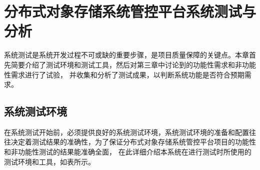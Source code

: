 \renewcommand{\arraystretch}{1.5}
\chapter{分布式对象存储系统管控平台系统测试与分析}

系统测试是系统开发过程不可或缺的重要步骤，是项目质量保障的关键点。本章首先简要介绍了测试环境和测试工具，然后对第三章中讨论到的功能性需求和非功能性需求进行了试验，
并收集和分析了测试成果，以判断系统功能是否符合预期需求。

\section{系统测试环境}

在系统测试开始前，必须提供良好的系统测试环境，系统测试环境的准备和配置往往决定着测试结果的准确性，为了保证分布式对象存储系统管控平台项目的功能性和非功能性测试的结果能准确全面，
在此详细介绍本系统在进行测试时所使用的测试环境和工具，如表所示。

\begin{center}
    \renewcommand\arraystretch{1.5}{
    }
    \vspace{-1cm}
\end{center}

